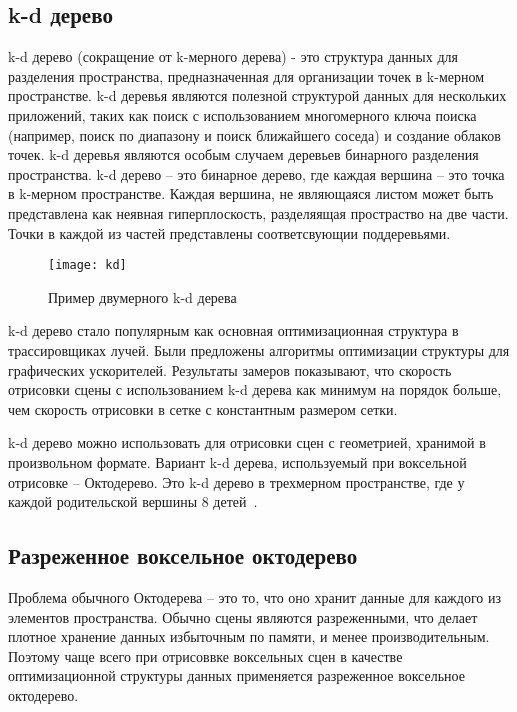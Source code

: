 \subsection{k-d дерево}

k-d дерево (сокращение от k-мерного дерева) - это структура данных 
для разделения пространства, предназначенная для организации точек в 
k-мерном пространстве. k-d деревья являются полезной структурой данных 
для нескольких приложений, таких как поиск с использованием многомерного 
ключа поиска (например, поиск по диапазону и поиск ближайшего соседа) и 
создание облаков точек. k-d деревья являются особым случаем деревьев 
бинарного разделения пространства. k-d дерево -- это бинарное дерево, где каждая 
вершина -- это точка в k-мерном пространстве. Каждая вершина, не являющаяся листом 
может быть представлена как неявная гиперплоскость, разделяящая простраство на две части.
Точки в каждой из частей представлены соответсвующии поддеревьями.

\begin{figure}[htbp]
  \centering
  \texttt{[image: kd]}
  \caption{Пример двумерного k-d дерева}
\end{figure}

k-d дерево стало популярным как основная оптимизационная структура в 
трассировщиках лучей. Были предложены алгоритмы оптимизации структуры для графических
ускорителей. Результаты замеров показывают, что скорость отрисовки сцены с использованием
k-d дерева как минимум на порядок больше, чем скорость отрисовки в сетке с константным 
размером сетки.

k-d дерево можно использовать для отрисовки сцен с геометрией, хранимой в произвольном 
формате. Вариант k-d дерева, используемый при воксельной отрисовке -- Октодерево. Это k-d дерево в трехмерном пространстве, где у каждой родительской вершины 8 детей~\cite{KDTASfaGR}.

\subsection{Разреженное воксельное октодерево}

Проблема обычного Октодерева -- это то, что оно хранит данные для каждого из элементов 
пространства. Обычно сцены являются разреженными, что делает плотное хранение данных
избыточным по памяти, и менее производительным. Поэтому чаще всего при отрисоввке
воксельных сцен в качестве оптимизационной структуры данных применяется разреженное воксельное
октодерево.


